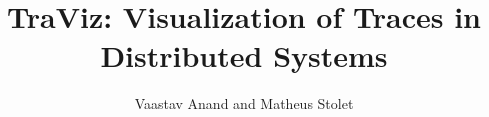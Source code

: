 \documentclass[journal]{vgtc}
\title{TraViz: Visualization of Traces in Distributed Systems}
\author{Vaastav Anand and Matheus Stolet}
\date{}
\begin{document}
\maketitle





















\balance
{\footnotesize


}
\end{document}
